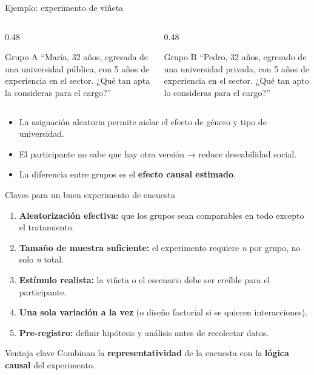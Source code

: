 \documentclass[aspectratio=169, 12pt]{beamer}
\begin{document}
\begin{frame}{Ejemplo: experimento de viñeta}
  \begin{columns}[T]
    \begin{column}{0.48\textwidth}
      \begin{block}{\centering Grupo A}
        \small``María, 32 años, egresada de una universidad pública, con 5 años de experiencia en el sector. ¿Qué tan apta la consideras para el cargo?''
      \end{block}
    \end{column}
    \begin{column}{0.48\textwidth}
      \begin{block}{\centering Grupo B}
        \small``Pedro, 32 años, egresado de una universidad privada, con 5 años de experiencia en el sector. ¿Qué tan apto lo consideras para el cargo?''
      \end{block}
    \end{column}
  \end{columns}
  \vspace{0.4cm}
  \begin{itemize}
    \item La asignación aleatoria permite aislar el efecto de \alert{género} y \alert{tipo de universidad}.
    \item El participante no sabe que hay otra versión → reduce deseabilidad social.
    \item La diferencia entre grupos es el \textbf{efecto causal estimado}.
  \end{itemize}
\end{frame}

\begin{frame}{Claves para un buen experimento de encuesta}
  \begin{enumerate}
    \item \textbf{Aleatorización efectiva:} que los grupos sean comparables en todo excepto el tratamiento.
    \item \textbf{Tamaño de muestra suficiente:} el experimento requiere \textit{n} por grupo, no solo \textit{n} total.
    \item \textbf{Estímulo realista:} la viñeta o el escenario debe ser creíble para el participante.
    \item \textbf{Una sola variación a la vez} (o diseño factorial si se quieren interacciones).
    \item \textbf{Pre-registro:} definir hipótesis y análisis antes de recolectar datos.
  \end{enumerate}
  \vspace{0.3cm}
  \begin{alertblock}{Ventaja clave}
    Combinan la \textbf{representatividad} de la encuesta con la \textbf{lógica causal} del experimento.
  \end{alertblock}
\end{frame}
\end{document}
